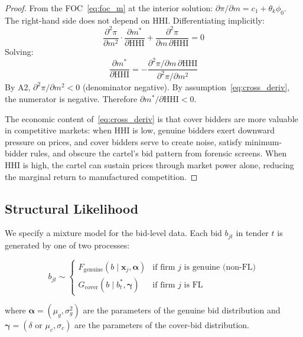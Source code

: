 \begin{proof}
From the FOC~\eqref{eq:foc_m} at the interior solution:
$\partial \pi / \partial m = c_1 + \theta_k \phi_0$. The right-hand
side does not depend on HHI. Differentiating implicitly:
\[
  \frac{\partial^2 \pi}{\partial m^2} \cdot
  \frac{\partial m^*}{\partial \text{HHI}}
  + \frac{\partial^2 \pi}{\partial m \, \partial \text{HHI}} = 0
\]
Solving:
\[
  \frac{\partial m^*}{\partial \text{HHI}} =
  -\frac{\partial^2 \pi / \partial m \, \partial \text{HHI}}
  {\partial^2 \pi / \partial m^2}
\]
By A2, $\partial^2 \pi / \partial m^2 < 0$ (denominator negative).
By assumption~\eqref{eq:cross_deriv}, the numerator is negative.
Therefore $\partial m^* / \partial \text{HHI} < 0$.

The economic content of~\eqref{eq:cross_deriv} is that cover bidders
are more valuable in competitive markets: when HHI is low, genuine
bidders exert downward pressure on prices, and cover bidders serve to
create noise, satisfy minimum-bidder rules, and obscure the cartel's
bid pattern from forensic screens. When HHI is high, the cartel can
sustain prices through market power alone, reducing the marginal return
to manufactured competition.
\end{proof}


\subsection{Structural Likelihood}
\label{sec:likelihood}

We specify a mixture model for the bid-level data. Each bid $b_{jt}$ in
tender $t$ is generated by one of two processes:

\begin{equation}
  b_{jt} \sim
  \begin{cases}
    F_{\text{genuine}}(b \mid \mathbf{x}_j, \boldsymbol{\alpha}) &
      \text{if firm } j \text{ is genuine (non-FL)} \\
    G_{\text{cover}}(b \mid b^*_t, \boldsymbol{\gamma}) &
      \text{if firm } j \text{ is FL}
  \end{cases}
  \label{eq:mixture}
\end{equation}

\noindent where $\boldsymbol{\alpha} = (\mu_g, \sigma_g^2)$ are the
parameters of the genuine bid distribution and $\boldsymbol{\gamma} =
(\delta \text{ or } \mu_c, \sigma_c)$ are the parameters of the
cover-bid distribution.

